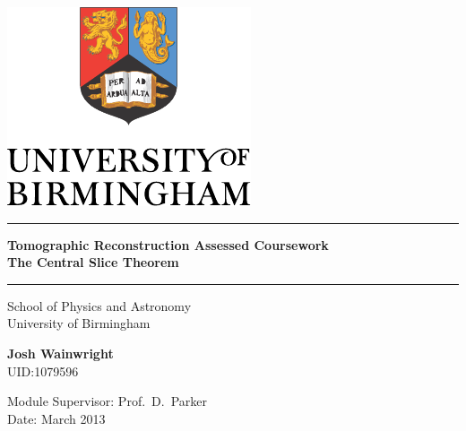 \begin{titlepage}
  \begin{center}
    \vspace*{\fill}

    \centering
    \includegraphics[scale=1.0]{Logo.pdf}
    \vfill

    \hrule
    {\LARGE\bf Tomographic Reconstruction Assessed Coursework\\The Central Slice Theorem \\[0.4cm]}
    \hrule

    \vfill
    \large
    School of Physics and Astronomy\\
    University of Birmingham

    \vfill
    {\bf Josh Wainwright\\}
    UID:1079596
    \vfill

    \vfill
    Module Supervisor: Prof.\ D.\ Parker\\
    Date: March 2013
    \vfill

    \vfill

  \end{center}
\end{titlepage}


